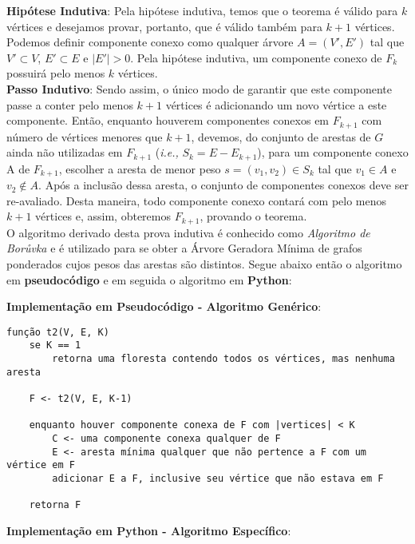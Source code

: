 \documentclass{article}
\begin{document}
\textbf{Hipótese Indutiva}: Pela hipótese indutiva, temos que o teorema é válido para $k$ vértices e desejamos provar, portanto, que é válido também para $k+1$ vértices. Podemos definir componente conexo como qualquer árvore $A=(V',E')$ tal que $V'\subset V$, $E'\subset E$ e $|E'|>0$. Pela hipótese indutiva, um componente conexo de $F_k$ possuirá pelo menos $k$ vértices.\\

\textbf{Passo Indutivo}: Sendo assim, o único modo de garantir que este componente passe a conter pelo menos $k+1$ vértices é adicionando um novo vértice a este componente. Então, enquanto houverem componentes conexos em $F_{k+1}$ com número de vértices menores que $k+1$, devemos, do conjunto de arestas de $G$ ainda não utilizadas em $F_{k+1}$ (\textit{i.e.,} $S_k=E-E_{k+1}$), para um componente conexo A de $F_{k+1}$, escolher a aresta de menor peso $s=(v_1,v_2)\in S_k$ tal que $v_1 \in A$ e $v_2 \notin A$. Após a inclusão dessa aresta, o conjunto de componentes conexos deve ser re-avaliado. Desta maneira, todo componente conexo contará com pelo menos $k+1$ vértices e, assim, obteremos $F_{k+1}$, provando o teorema.\\

O algoritmo derivado desta prova indutiva é conhecido como \textit{Algoritmo de Borůvka} e é utilizado para se obter a Árvore Geradora Mínima de grafos ponderados cujos pesos das arestas são distintos. Segue abaixo então o algoritmo em \textbf{pseudocódigo} e em seguida o algoritmo em \textbf{Python}:\\

\pagebreak

\textbf{Implementação em Pseudocódigo - Algoritmo Genérico}:

{\color{ogreen}
\begin{verbatim}
função t2(V, E, K)
    se K == 1
        retorna uma floresta contendo todos os vértices, mas nenhuma aresta

    F <- t2(V, E, K-1)

    enquanto houver componente conexa de F com |vertices| < K
        C <- uma componente conexa qualquer de F
        E <- aresta mínima qualquer que não pertence a F com um vértice em F
        adicionar E a F, inclusive seu vértice que não estava em F

    retorna F
\end{verbatim}
}

\textbf{Implementação em Python - Algoritmo Específico}:
\end{document}
